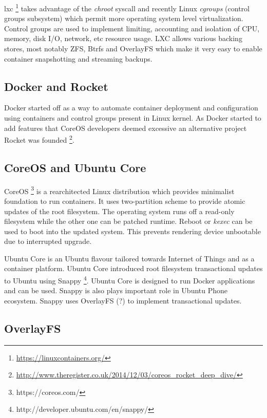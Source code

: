 \documentclass[a4paper,11pt]{kth-mag}
\begin{document}
\cite{btrfs-the-linux-b-tree-filesystem}
\cite{chris-mason-the-btrfs-filesystem}




\gls{lxc}
\footnote{\url{https://linuxcontainers.org/}}
takes advantage of the \emph{chroot} syscall and
recently Linux \emph{cgroups} (control groups subsystem) which permit
more  operating system level virtualization.
Control groups are used to implement limiting, accounting
and isolation of CPU, memory, disk I/O, network, etc resource usage.
LXC allows various backing stores, most notably ZFS, Btrfs and
OverlayFS which make it very easy to enable container
snapshotting and streaming backups.

\subsection{Docker and Rocket}

Docker started off as a way to automate container deployment and
configuration using containers and control groups present in Linux
kernel. As Docker started to add features that CoreOS developers
deemed excessive an alternative project Rocket was founded
\footnote{\url{http://www.theregister.co.uk/2014/12/03/coreos_rocket_deep_dive/}}.

\subsection{CoreOS and Ubuntu Core}

CoreOS \footnote{https://coreos.com/} is a rearchitected Linux
distribution which provides minimalist foundation to run containers.
It uses two-partition scheme to provide atomic updates of the root
filesystem. The operating system runs off a read-only filesystem
while the other one can be patched runtime. Reboot or \emph{kexec}
can be used to boot into the updated system. This prevents rendering
device unbootable due to interrupted upgrade.

Ubuntu Core is an Ubuntu flavour tailored towards Internet of Things
and as a container platform. Ubuntu Core introduced root filesystem
transactional updates to Ubuntu using Snappy
\footnote{http://developer.ubuntu.com/en/snappy/}.
Ubuntu Core is designed to run Docker applications and can be used.
Snappy is also plays important role in Ubuntu Phone ecosystem.
Snappy uses OverlayFS (?) to implement transactional updates.


\subsection{OverlayFS}
\end{document}
